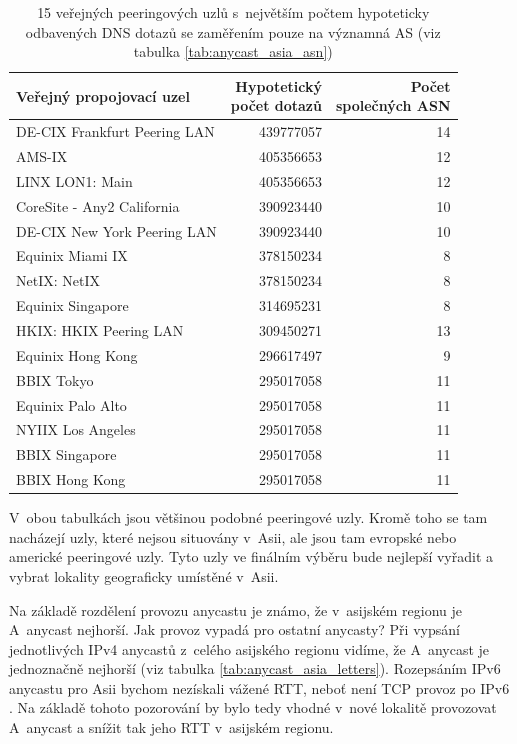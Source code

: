 \documentclass[thesis=M,czech]{src/FITthesis}[2019/12/23]
\begin{document}
\begin{table}
\centering
\begin{tabular}{lrr}
\toprule
     Veřejný propojovací uzel  &  \makecell{Hypotetický\\počet dotazů} &  \makecell{Počet\\ společných ASN} \\
\midrule
DE-CIX Frankfurt Peering LAN &  439777057 & 14 \\
                      AMS-IX &  405356653 & 12 \\
             LINX LON1: Main &  405356653 & 12 \\
  CoreSite - Any2 California &  390923440 & 10 \\
 DE-CIX New York Peering LAN &  390923440 & 10 \\
            Equinix Miami IX &  378150234 &  8 \\
                NetIX: NetIX &  378150234 &  8 \\
           Equinix Singapore &  314695231 &  8 \\
      HKIX: HKIX Peering LAN &  309450271 & 13 \\
           Equinix Hong Kong &  296617497 &  9 \\
                  BBIX Tokyo &  295017058 & 11 \\
           Equinix Palo Alto &  295017058 & 11 \\
           NYIIX Los Angeles &  295017058 & 11 \\
              BBIX Singapore &  295017058 & 11 \\
              BBIX Hong Kong &  295017058 & 11 \\
\bottomrule
\end{tabular}
 	\caption[]{15 veřejných peeringových uzlů s~největším počtem hypoteticky
odbavených DNS dotazů se zaměřením pouze na významná AS (viz tabulka \ref{tab:anycast_asia_asn})} 
 	\label{tab:anycast_node_asn_top}
\end{table}

V~obou tabulkách jsou většinou podobné peeringové uzly. Kromě toho se tam nacházejí uzly, které nejsou situovány v~Asii, ale jsou tam evropské nebo americké peeringové uzly.  Tyto uzly ve finálním výběru bude nejlepší vyřadit a vybrat lokality geograficky umístěné v~Asii. 

Na základě rozdělení provozu anycastu je známo, že v~asijském regionu je A~anycast nejhorší. Jak provoz vypadá pro ostatní anycasty? Při vypsání jednotlivých IPv4 anycastů z~celého asijského regionu vidíme, že A~anycast je jednoznačně nejhorší (viz tabulka \ref{tab:anycast_asia_letters}). Rozepsáním IPv6 anycastu pro Asii bychom nezískali vážené RTT, neboť není TCP provoz po IPv6 . Na základě tohoto pozorování by bylo tedy vhodné v~nové lokalitě provozovat A~anycast a snížit tak jeho RTT v~asijském regionu.
\end{document}
